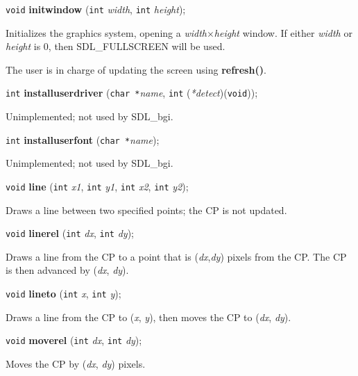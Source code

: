 \documentclass[a4paper,11pt]{article}
\newcommand{\SDLbgi}{SDL\_bgi}
\newcommand{\V}{\texttt{void}}      %
\newcommand{\I}{\texttt{int}}       %
\newcommand{\C}{\texttt{char *}}    %
\newcommand{\func}[1]{\textbf{#1}}  %
\newcommand{\A}[1]{\emph{#1}}       %
\newenvironment{bgi}
{ %
  \begin{snugshade}
}
{ %
  \end{snugshade}
}
\begin{document}

\begin{bgi}
\V{} \func{initwindow} (\I{} \A{width}, \I{} \A{height});
\end{bgi}

Initializes the graphics system, opening a \A{width}$\times$\A{height}
window. If either \A{width} or \A{height} is 0, then
SDL\-\_FULL\-SCREEN will be used.

The user is in charge of updating the screen using \func{refresh()}.


\begin{bgi}
\I{} \func{installuserdriver} (\C{}\A{name}, \I{} (\A{*detect})(\V{})); 
\end{bgi}

Unimplemented; not used by \SDLbgi.


\begin{bgi}
\I{} \func{installuserfont} (\C{}\A{name}); 
\end{bgi}

Unimplemented; not used by \SDLbgi.


\begin{bgi}
\V{} \func{line} (\I{} \A{x1}, \I{} \A{y1}, \I{} \A{x2}, \I{} \A{y2});
\end{bgi}

Draws a line between two specified points; the CP is not updated.


\begin{bgi}
\V{} \func{linerel} (\I{} \A{dx}, \I{} \A{dy});
\end{bgi}

Draws a line from the CP to a point that is (\A{dx},\A{dy}) pixels
from the CP. The CP is then advanced by (\A{dx}, \A{dy}).


\begin{bgi}
\V{} \func{lineto} (\I{} \A{x}, \I{} \A{y});
\end{bgi}

Draws a line from the CP to (\A{x}, \A{y}), then moves the CP to
(\A{dx}, \A{dy}).


\begin{bgi}
\V{} \func{moverel} (\I{} \A{dx}, \I{} \A{dy});
\end{bgi}

Moves the CP by (\A{dx}, \A{dy}) pixels.
\end{document}
